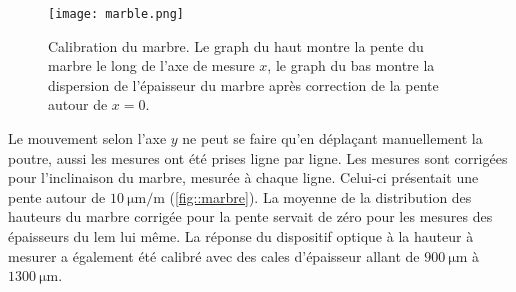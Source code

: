           \begin{figure}[htpb]
            \centering
            \texttt{[image: marble.png]}
            \caption[Calibration du système de mesure \gls{cci}.]{\label{fig::marbre}Calibration du marbre. Le graph du haut montre la pente du marbre le long de l'axe de mesure $x$, le graph du bas montre la dispersion de l'épaisseur du marbre après correction de la pente autour de $x=0$.}
          \end{figure}
          Le mouvement selon l'axe $y$ ne peut se faire qu'en déplaçant manuellement la poutre, aussi les mesures ont été prises ligne par ligne. Les mesures sont corrigées pour l'inclinaison du marbre, mesurée à chaque ligne. Celui-ci présentait une pente autour de $\SI{10}{\micro\meter\per\meter}$ (\autoref{fig::marbre}). La moyenne de la distribution des hauteurs du marbre corrigée pour la pente servait de zéro pour les mesures des épaisseurs du \gls{lem} lui même. La réponse du dispositif optique à la hauteur à mesurer a également été calibré avec des cales d'épaisseur allant de $\SI{900}{\micro\meter}$ à $\SI{1300}{\micro\meter}$.
          
